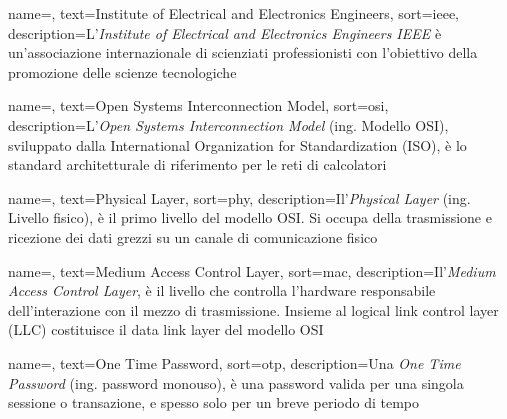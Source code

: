  {
    name=,
    text=Institute of Electrical and Electronics Engineers,
    sort=ieee,
    description={L'\emph{Institute of Electrical and Electronics Engineers IEEE} è un'associazione internazionale di scienziati professionisti con l'obiettivo della promozione delle scienze tecnologiche}
}

 {
    name=,
    text=Open Systems Interconnection Model,
    sort=osi,
    description={L'\emph{Open Systems Interconnection Model} (ing. Modello OSI), sviluppato dalla International Organization for Standardization (ISO), è lo standard architetturale di riferimento per le reti di calcolatori}
}

 {
    name=,
    text=Physical Layer,
    sort=phy,
    description={Il'\emph{Physical Layer} (ing. Livello fisico), è il primo livello del modello OSI. Si occupa della trasmissione e ricezione dei dati grezzi su un canale di comunicazione fisico}
}

 {
    name=,
    text=Medium Access Control Layer,
    sort=mac,
    description={Il'\emph{Medium Access Control Layer}, è il livello che controlla l'hardware responsabile dell'interazione con il mezzo di trasmissione. Insieme al logical link control layer (LLC) costituisce il data link layer del modello OSI}
}

 {
    name=,
    text=One Time Password,
    sort=otp,
    description={Una \emph{One Time Password} (ing. password monouso), è una password valida per una singola sessione o transazione, e spesso solo per un breve periodo di tempo} 
}